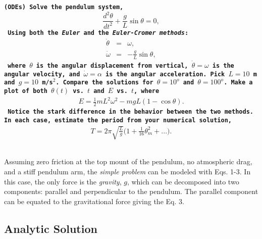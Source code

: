 \documentclass[12pt]{article}
\author{\color{purple}{\bf MIA STEIN}}
\title{\color{red}{\bf PHYS 688: Numerical Methods for AstroPhysics \\Homework \#2: ODEs} }
\newcounter{question}[section]
\newcommand{\question}[2] {\vspace{.25in} \fbox{#1} #2 \vspace{.10in}}
\begin{document}
\maketitle



{\color{MidnightBlue}
\question{Q.1}{\texttt{{\bf(ODEs)} {\bf Solve the pendulum system, 
$$\frac{d^2\theta}{dt^2} + \frac{g}{L} \sin \theta = 0,$$
Using both the {\it Euler} and the {\it Euler-Cromer methods}:
\begin{eqnarray}
 \dot \theta &=& \omega, \\
 \dot \omega &=& -\frac{g}{L} \sin \theta,
\label{pen1}
\end{eqnarray}
where $\theta$ is the angular displacement from vertical, $\dot \theta = \omega$ is the angular velocity, and $\dot \omega = \alpha$ is the angular acceleration. Pick $L = 10$ m and $g = 10$ m/s$^2$. Compare the solutions for $\theta = 10^o$ and $\theta =100^o$. Make a plot of both $\theta (t)$ vs. $t$ and $E$ vs. $t$, where
\begin{eqnarray}
E = \frac{1}{2} m L^2 \omega^2 - mgL (1 - \cos \theta).
\label{E}
\end{eqnarray}
 Notice the stark difference in the behavior between the two methods. In each case, estimate the period from your numerical solution,
\begin{eqnarray}
T = 2 \pi \sqrt{\frac{L}{g}} \Bigg ( 1 + \frac{1}{16}\theta^2_m + ... \Bigg).
\label{T}
\end{eqnarray}
 }}}}

\quad


Assuming zero friction at the top mount of the pendulum, no atmospheric drag, and a stiff pendulum arm, the {\it simple problem} can be modeled with Eqs. 1-3. In this case, the only force is the {\it gravity}, $g$, which can be decomposed into two components:  parallel and  perpendicular to the pendulum.  The parallel component can be equated to the  gravitational force giving the Eq. 3. 

\quad

\subsection*{Analytic Solution}
\end{document}
